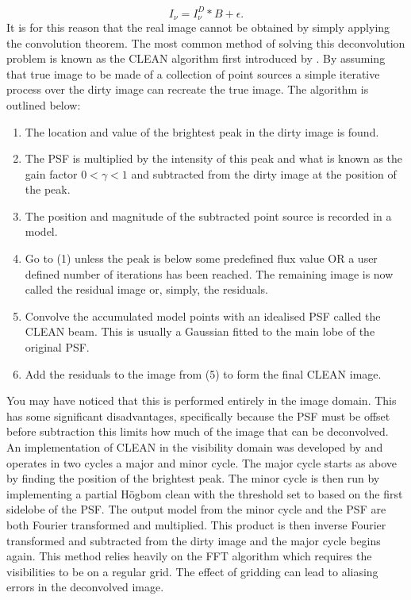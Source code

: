 \begin{equation}
\label{eq:int_convolutionnoise}
I_\nu = I_\nu^D \ast B + \epsilon.
\end{equation}
It is for this reason that the real image cannot be obtained by simply applying the convolution theorem.  The most common method of solving this deconvolution problem is known as the CLEAN algorithm first introduced by \cite{Hogbom1974}. By assuming that true image to be made of a collection of point sources a simple iterative process over the dirty image can recreate the true image. The algorithm is outlined below:
\begin{enumerate}
\item The location and value of the brightest peak in the dirty image is found.
\item The PSF is multiplied by the intensity of this peak and what is known as the gain factor $0 < \gamma < 1$ and subtracted from the dirty image at the position of the peak.
\item The position and magnitude of the subtracted point source is recorded in a model.
\item Go to (1) unless the peak is below some predefined flux value OR a user defined number of iterations has been reached. The remaining image is now called the residual image or, simply, the residuals. 
\item Convolve the accumulated model points with an idealised PSF called the CLEAN beam. This is usually a Gaussian fitted to the main lobe of the original PSF.
\item Add the residuals to the image from (5) to form the final CLEAN image.
\end{enumerate}
You may have noticed that this is performed entirely in the image domain. This has some significant disadvantages, specifically because the PSF must be offset before subtraction this limits how much of the image that can be deconvolved. An implementation of CLEAN in the visibility domain was developed by \cite{Clark1980} and operates in two cycles a major and minor cycle. The major cycle starts as above by finding the position of the brightest peak. The minor cycle is then run by implementing a partial H\"ogbom clean with the threshold set to based on the first sidelobe of the PSF. The output model from the minor cycle and the PSF are both Fourier transformed and multiplied. This product is then inverse Fourier transformed and subtracted from the dirty image and the major cycle begins again. This method relies heavily on the FFT algorithm which requires the visibilities to be on a regular grid. The effect of gridding can lead to aliasing errors in the deconvolved image. 

